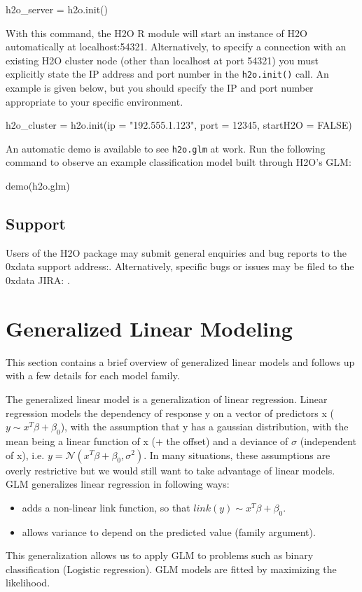\documentclass[11pt]{article}
\begin{document}
\begin{spverbatim}
h2o_server = h2o.init()

\end{spverbatim}
\noindent
With this command, the H2O R module will start an instance of H2O automatically at localhost:54321. Alternatively,  to specify a connection with an existing H2O cluster node (other than localhost at port 54321) you must explicitly state the IP address and port number in the \texttt{h2o.init()} call. An example is given below, but you should specify the IP and port number appropriate to your specific environment.

\begin{spverbatim}
h2o_cluster = h2o.init(ip = "192.555.1.123", port = 12345, startH2O = FALSE)

\end{spverbatim}
\noindent
An automatic demo is available to see \texttt{h2o.glm} at work. Run the following command to observe an example classification model built through H2O's GLM:

\begin{spverbatim}
demo(h2o.glm)
\end{spverbatim}

\subsection{Support} 

Users of the H2O package may submit general enquiries and bug reports to the 0xdata support address:. Alternatively, specific bugs or issues may be filed to the 0xdata JIRA: .

\section{Generalized Linear Modeling} 
This section contains a brief overview of generalized linear models and follows up with a few details for each model family.

The generalized linear model is a generalization of linear regression. Linear regression models the dependency of response y on a vector of predictors x ($y \sim x^T \beta + \beta_0$), with the assumption that y has a gaussian distribution, with the mean being a linear function of x (+ the offset) and a deviance of $\sigma$ (independent of x), i.e. $ y = \mathcal{N}(x^T \beta + \beta_0 , \sigma^2) $. In many situations, these assumptions are overly restrictive but we would still want to take advantage of linear models. GLM generalizes linear regression in following ways: 
\begin{itemize} 
\item adds a non-linear link function, so that $link(y) \sim x^T \beta + \beta_0$.
\item allows variance to depend on the predicted value (family argument).

\end{itemize}
This generalization allows us to apply GLM to problems such as binary classification (Logistic regression).
GLM models are fitted by maximizing the likelihood.
\end{document}
